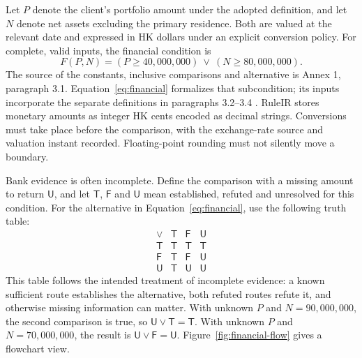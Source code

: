 \documentclass[12pt,a4paper,oneside,openany]{book}
\newcommand{\True}{\mathsf{T}}
\newcommand{\False}{\mathsf{F}}
\newcommand{\Unknown}{\mathsf{U}}
\begin{document}
Let $P$ denote the client's portfolio amount under the adopted definition, and
let $N$ denote net assets excluding the primary residence. Both are valued at the
relevant date and expressed in HK dollars under an explicit conversion policy.
For complete, valid inputs, the financial condition is
\begin{equation}
 F(P,N)=(P\geq 40{,}000{,}000)\ \lor\ (N\geq 80{,}000{,}000).
 \label{eq:financial}
\end{equation}
The source of the constants, inclusive comparisons and alternative is Annex 1,
paragraph 3.1. Equation~\eqref{eq:financial} formalizes that subcondition; its
inputs incorporate the separate definitions in paragraphs 3.2--3.4
\citep{sfcspiannex1}. RuleIR stores monetary amounts as
integer HK cents encoded as decimal strings. Conversions must take place
before the comparison, with the exchange-rate source and valuation instant
recorded. Floating-point rounding must not silently move a boundary.

Bank evidence is often incomplete. Define the comparison with a missing amount
to return $\Unknown$, and let $\True$, $\False$ and $\Unknown$ mean established,
refuted and unresolved for this condition. For the alternative in
Equation~\eqref{eq:financial}, use the following truth table:
\begin{equation}
\begin{array}{c|ccc}
\lor & \True & \False & \Unknown\\\hline
\True & \True & \True & \True\\
\False & \True & \False & \Unknown\\
\Unknown & \True & \Unknown & \Unknown
\end{array}
\label{eq:or}
\end{equation}
This table follows the intended treatment of incomplete evidence: a known
sufficient route establishes the alternative, both refuted routes refute it,
and otherwise missing information can matter. With unknown $P$ and
$N=90{,}000{,}000$, the second comparison is true, so
$\Unknown\lor\True=\True$. With unknown $P$ and $N=70{,}000{,}000$, the result
is $\Unknown\lor\False=\Unknown$. Figure~\ref{fig:financial-flow} gives a
flowchart view.
\end{document}
